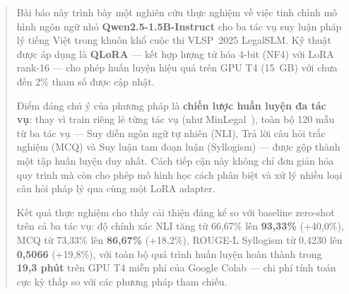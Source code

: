 \documentclass[fontsize=13pt,a4paper,oneside,DIV=calc,chapterprefix=true]{scrbook}
\begin{document}
\begin{abstract}
Bài báo này trình bày một nghiên cứu thực nghiệm về việc tinh chỉnh mô hình ngôn ngữ nhỏ
\textbf{Qwen2.5-1.5B-Instruct} cho ba tác vụ suy luận pháp lý tiếng Việt trong khuôn khổ
cuộc thi VLSP~2025 LegalSLM. Kỹ thuật được áp dụng là \textbf{QLoRA} --- kết hợp lượng
tử hóa 4-bit (NF4) với LoRA rank-16 --- cho phép huấn luyện hiệu quả trên GPU T4 (15~GB)
với chưa đến 2\% tham số được cập nhật.

Điểm đáng chú ý của phương pháp là \textbf{chiến lược huấn luyện đa tác vụ}: thay vì train
riêng lẻ từng tác vụ (như MinLegal~\cite{minlegal2025}), toàn bộ 120 mẫu từ ba tác vụ ---
Suy diễn ngôn ngữ tự nhiên (NLI), Trả lời câu hỏi trắc nghiệm (MCQ) và Suy luận tam đoạn
luận (Syllogism) --- được gộp thành một tập huấn luyện duy nhất. Cách tiếp cận này không chỉ
đơn giản hóa quy trình mà còn cho phép mô hình học cách phân biệt và xử lý nhiều loại câu
hỏi pháp lý qua cùng một LoRA adapter.

Kết quả thực nghiệm cho thấy cải thiện đáng kể so với baseline zero-shot trên cả ba tác vụ:
độ chính xác NLI tăng từ 66,67\% lên \textbf{93,33\%} (+40,0\%), MCQ từ 73,33\% lên
\textbf{86,67\%} (+18,2\%), ROUGE-L Syllogism từ 0,4230 lên \textbf{0,5066} (+19,8\%),
với toàn bộ quá trình huấn luyện hoàn thành trong \textbf{19,3 phút} trên GPU T4 miễn phí
của Google Colab --- chi phí tính toán cực kỳ thấp so với các phương pháp tham chiếu.
\end{abstract}

\printnomenclature

\tableofcontents
\listoftables
\listoffigures
\end{document}

